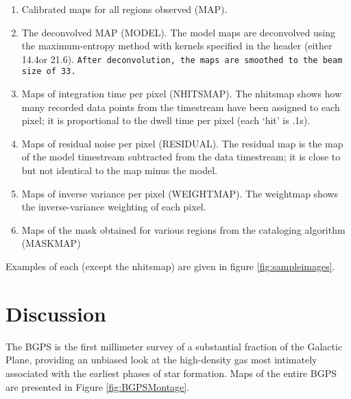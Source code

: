 \documentclass{emulateapj}
\newcommand{\bcamfwhm}{33\arcsec}
\begin{document}
\begin{enumerate}
\item Calibrated maps for all regions observed (MAP).


\item The deconvolved MAP (MODEL).  The model maps are deconvolved
using the maximum-entropy method with kernels specified in the header
(either 14.4\arcsec or 21.6\arcsec).  {\tt After deconvolution, the maps
are smoothed to the beam size of \bcamfwhm.}

\item Maps of integration time per pixel (NHITSMAP).  The nhitsmap
shows how many recorded data points from the timestream have been
assigned to each pixel; it is proportional to the dwell time per pixel
(each `hit' is .1s).

\item Maps of residual noise per pixel (RESIDUAL).  The residual map
is the map of the model timestream subtracted from the data
timestream; it is close to but not identical to the map minus the
model.

\item Maps of inverse variance per pixel (WEIGHTMAP).  The weightmap
shows the inverse-variance weighting of each pixel.

\item Maps of the mask obtained for various regions from the
cataloging algorithm (MASKMAP) \citep{rosolowsky09}

\end{enumerate}

Examples of each (except the nhitsmap) are given in figure
\ref{fig:sampleimages}.

\section{Discussion}
\label{sec:Discussion}


The BGPS is the first millimeter survey of a substantial fraction of
the Galactic Plane, providing an unbiased look at the high-density gas
most intimately associated with the earliest phases of star formation.
Maps of the entire BGPS are presented in Figure \ref{fig:BGPSMontage}.
\end{document}
